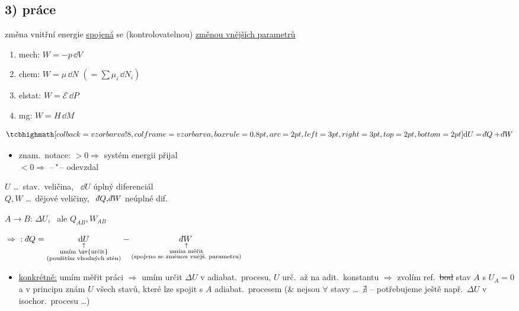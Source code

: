 \subsection*{3) práce}
změna vnitřní energie \underline{spojená} se (kontrolovatelnou) \underline{změnou vnějších parametrů}
\begin{enumerate}[label=\alph*)]
  \item mech: \quad $W = -p\,\dd V$
  \item chem: \quad $W = \mu\,\dd N$ \quad $(= \sum\mu_i\,\dd N_i)$
  \item elstat: \quad $W = \mathcal{E}\,\dd P$
  \item mg: \quad $W = H\,\dd M$
\end{enumerate}

\begin{veta}[1.\ TDZ]
\[ \vzorec{\dd U = \dbar Q + \dbar W} \]
\begin{itemize}[nosep]
  \item znam.\ notace: \quad $> 0 \Rightarrow$ systém energii přijal \\
        \hspace*{2.75cm} $< 0 \Rightarrow$ \quad --\,{}"\,-- \quad odevzdal
\end{itemize}
\end{veta}

$U$ \dots\ stav.\ veličina, \ $\dd U$ úplný diferenciál \\
$Q, W$ \dots\ dějové veličiny, \ $\dbar Q, \dbar W$ neúplné dif.

\pozor{!} \quad $A\to B$: \quad $\Delta U$, \ ale $Q_{AB}, W_{AB}$

$\Rightarrow$ : \quad
$\dbar Q = \underset{\substack{\uparrow\\ \text{umím \uv{určit}}\\ \text{(použitím vhodných stěn)}}}{\dd U} - \underset{\substack{\uparrow\\ \text{umím měřit}\\ \text{(spojeno se změnou vnějš.\ parametru)}}}{\dbar W}$

\begin{itemize}
  \item \underline{konkrétně:} umím měřit práci $\Rightarrow$ umím určit $\Delta U$ v adiabat.\ procesu, $U$ urč.\ až na adit.\ konstantu
  $\Rightarrow$ zvolím ref.\ \sout{bod} stav $A$ s $U_A = 0$ a v principu znám $U$ všech stavů, které lze spojit s $A$ adiabat.\ procesem (\& nejsou $\forall$ stavy \dots\ $\nexists$ -- potřebujeme ještě např.\ $\Delta U$ v isochor.\ procesu \dots)
\end{itemize}

